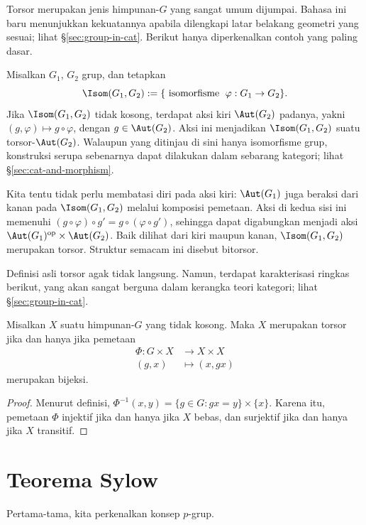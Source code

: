 Torsor merupakan jenis himpunan-$G$ yang sangat umum dijumpai. Bahasa ini baru menunjukkan kekuatannya apabila dilengkapi latar belakang geometri yang sesuai; lihat \S\ref{sec:group-in-cat}. Berikut hanya diperkenalkan contoh yang paling dasar.
\begin{example}
	Misalkan $G_1$, $G_2$ grup, dan tetapkan
	\[ \Isom(G_1, G_2) := \{ \text{ isomorfisme } \; \varphi: G_1 \to G_2 \}. \]
	Jika $\Isom(G_1, G_2)$ tidak kosong, terdapat aksi kiri $\Aut(G_2)$ padanya, yakni $(g, \varphi) \mapsto g \circ \varphi$, dengan $g \in \Aut(G_2)$. Aksi ini menjadikan $\Isom(G_1, G_2)$ suatu torsor-$\Aut(G_2)$. Walaupun yang ditinjau di sini hanya isomorfisme grup, konstruksi serupa sebenarnya dapat dilakukan dalam sebarang kategori; lihat \S\ref{sec:cat-and-morphism}.

	Kita tentu tidak perlu membatasi diri pada aksi kiri: $\Aut(G_1)$ juga beraksi dari kanan pada $\Isom(G_1, G_2)$ melalui komposisi pemetaan. Aksi di kedua sisi ini memenuhi $(g \circ \varphi) \circ g' = g \circ (\varphi \circ g')$, sehingga dapat digabungkan menjadi aksi $\Aut(G_1)^{\text{op}} \times \Aut(G_2)$. Baik dilihat dari kiri maupun kanan, $\Isom(G_1, G_2)$ merupakan torsor. Struktur semacam ini disebut bitorsor.
\end{example}

Definisi asli torsor agak tidak langsung. Namun, terdapat karakterisasi ringkas berikut, yang akan sangat berguna dalam kerangka teori kategori; lihat \S\ref{sec:group-in-cat}.

\begin{lemma}\label{prop:torsor-criterion}
	Misalkan $X$ suatu himpunan-$G$ yang tidak kosong. Maka $X$ merupakan torsor jika dan hanya jika pemetaan
	\begin{align*}
		\Phi: G \times X & \longrightarrow X \times X \\
		(g, x) &  \longmapsto (x, gx)
	\end{align*}
	merupakan bijeksi.
\end{lemma}
\begin{proof}
	Menurut definisi, $\Phi^{-1}(x,y) = \{g \in G: gx=y\} \times \{x\}$. Karena itu, pemetaan $\Phi$ injektif jika dan hanya jika $X$ bebas, dan surjektif jika dan hanya jika $X$ transitif.
\end{proof}
\section{Teorema Sylow}\label{sec:Sylow}
Pertama-tama, kita perkenalkan konsep $p$-grup.

